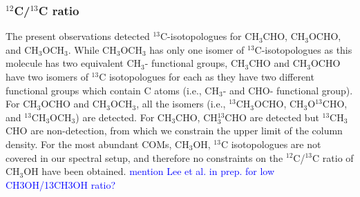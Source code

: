 \documentclass[linenumbers, twocolumn, twocolappendix, astrosymb, times]{aastex631}
\newcommand{\methanol}{CH$_3$OH\xspace}
\newcommand{\acetaldehyde}{CH$_3$CHO\xspace}
\newcommand{\methylformate}{CH$_3$OCHO\xspace}
\newcommand{\dimethylether}{CH$_3$OCH$_3$\xspace}
\begin{document}
\subsubsection{$^{12}$C/$^{13}$C ratio}
The present observations detected $^{13}$C-isotopologues for \acetaldehyde, \methylformate, and \dimethylether. While \dimethylether has only one isomer of $^{13}$C-isotopologues as this molecule has two equivalent CH$_3$- functional groups, \acetaldehyde and \methylformate have two isomers of $^{13}$C isotopologues for each as they have two different functional groups which contain C atoms (i.e., CH$_3$- and CHO- functional group). For \methylformate and \dimethylether, all the isomers (i.e., $^{13}$CH$_3$OCHO, CH$_3$O$^{13}$CHO, and $^{13}$CH$_3$OCH$_3$) are detected. For \acetaldehyde, CH$_3^{13}$CHO are detected but $^{13}$CH$_3$CHO are non-detection, from which we constrain the upper limit of the column density. For the most abundant COMs, \methanol, $^{13}$C isotopologues are not covered in our spectral setup, and therefore no constraints on the $^{12}$C/$^{13}$C ratio of \methanol have been obtained. \textcolor{blue}{mention Lee et al. in prep. for low CH3OH/13CH3OH ratio?}
\end{document}

